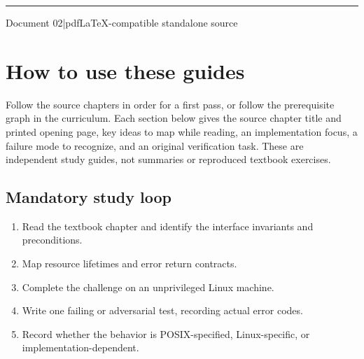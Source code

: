 \documentclass[11pt,letterpaper,oneside]{report}
\begin{document}
\hypersetup{pageanchor=false}%
\begin{titlepage}\centering{}\vspace{0.6cm}{\Large Original learning companions in the textbook's sequence\par}\vspace{2cm}\rule{0.75\textwidth}{1.2pt}\par\vspace{0.55cm}{\large An original companion to Michael Kerrisk\textquotesingle s 2010 text}\par\vspace{0.3cm}{\large Edition 1.0\quad |\quad October 2026}\par\vfill{\small Document 02\quad |\quad pdfLaTeX-compatible standalone source}\par\end{titlepage}\hypersetup{pageanchor=true}
\tableofcontents\clearpage
\chapter{How to use these guides}
Follow the source chapters in order for a first pass, or follow the prerequisite graph in the curriculum. Each section below gives the source chapter title and printed opening page, key ideas to map while reading, an implementation focus, a failure mode to recognize, and an original verification task. These are independent study guides, not summaries or reproduced textbook exercises.

\section{Mandatory study loop}
\begin{enumerate}
\item Read the textbook chapter and identify the interface invariants and preconditions.
\item Map resource lifetimes and error return contracts.
\item Complete the challenge on an unprivileged Linux machine.
\item Write one failing or adversarial test, recording actual error codes.
\item Record whether the behavior is POSIX-specified, Linux-specific, or implementation-dependent.
\end{enumerate}
\end{document}
